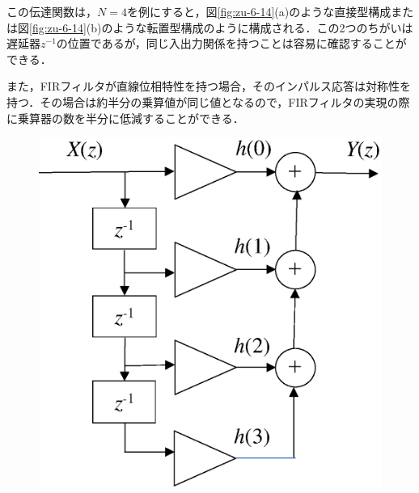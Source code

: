 この伝達関数は，$N=4$を例にすると，図\ref{fig:zu-6-14}(a)のような直接型構成または図\ref{fig:zu-6-14}(b)のような転置型構成のように構成される．この2つのちがいは遅延器$z^{-1}$の位置であるが，同じ入出力関係を持つことは容易に確認することができる．

また，FIRフィルタが直線位相特性を持つ場合，そのインパルス応答は対称性を持つ．その場合は約半分の乗算値が同じ値となるので，FIRフィルタの実現の際に乗算器の数を半分に低減することができる．

\begin{figure}[H]
\begin{center}
\begin{minipage}{.4\textwidth}
\begin{center}
\includegraphics[width=.98\textwidth]{fig/zu-6-14-a.eps}


\end{center}
\end{minipage}
\end{center}
\end{figure}
